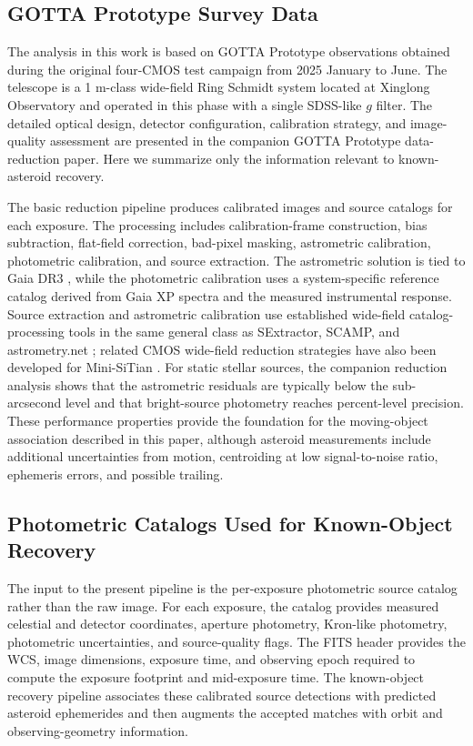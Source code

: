 \documentclass[referee]{raa}
\begin{document}
\subsection{GOTTA Prototype Survey Data}

The analysis in this work is based on GOTTA Prototype observations obtained during the original four-CMOS test campaign from 2025 January to June. The telescope is a 1 m-class wide-field Ring Schmidt system located at Xinglong Observatory and operated in this phase with a single SDSS-like $g$ filter. The detailed optical design, detector configuration, calibration strategy, and image-quality assessment are presented in the companion GOTTA Prototype data-reduction paper. Here we summarize only the information relevant to known-asteroid recovery.

The basic reduction pipeline produces calibrated images and source catalogs for each exposure. The processing includes calibration-frame construction, bias subtraction, flat-field correction, bad-pixel masking, astrometric calibration, photometric calibration, and source extraction. The astrometric solution is tied to Gaia DR3 \citep{Gaia2023}, while the photometric calibration uses a system-specific reference catalog derived from Gaia XP spectra and the measured instrumental response. Source extraction and astrometric calibration use established wide-field catalog-processing tools in the same general class as SExtractor, SCAMP, and astrometry.net \citep{Bertin1996,Bertin2006,Lang2010}; related CMOS wide-field reduction strategies have also been developed for Mini-SiTian \citep{Xiao2025}. For static stellar sources, the companion reduction analysis shows that the astrometric residuals are typically below the sub-arcsecond level and that bright-source photometry reaches percent-level precision. These performance properties provide the foundation for the moving-object association described in this paper, although asteroid measurements include additional uncertainties from motion, centroiding at low signal-to-noise ratio, ephemeris errors, and possible trailing.

\subsection{Photometric Catalogs Used for Known-Object Recovery}

The input to the present pipeline is the per-exposure photometric source catalog rather than the raw image. For each exposure, the catalog provides measured celestial and detector coordinates, aperture photometry, Kron-like photometry, photometric uncertainties, and source-quality flags. The FITS header provides the WCS, image dimensions, exposure time, and observing epoch required to compute the exposure footprint and mid-exposure time. The known-object recovery pipeline associates these calibrated source detections with predicted asteroid ephemerides and then augments the accepted matches with orbit and observing-geometry information.
\end{document}
